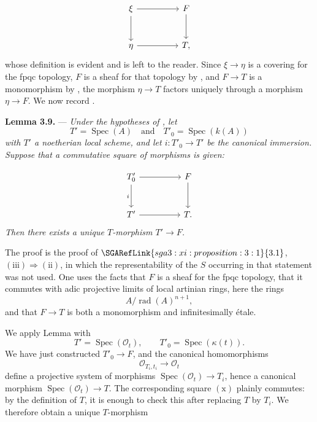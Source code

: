 \[
\begin{tikzcd}[column sep=huge,row sep=large]
  \xi \arrow[r] \arrow[d] & F \arrow[d] \\
  \eta \arrow[r] & T ,
\end{tikzcd}
\]
whose definition is evident and is left to the reader.  Since
\(\xi\to\eta\) is a covering for the fpqc topology, \(F\) is a sheaf
for that topology by , and \(F\to T\) is a monomorphism by , the
morphism \(\eta\to T\) factors uniquely through a morphism
\(\eta\to F\).  We now record .

\medskip
\noindent{}\textbf{Lemma 3.9.} ---
\textit{Under the hypotheses of
, let
\[
  T'=\operatorname{Spec}(A)
  \quad\text{and}\quad
  T'_0=\operatorname{Spec}(k(A))
\]
with \(T'\) a noetherian local scheme, and let
\(i:T'_0\to T'\) be the canonical immersion.  Suppose that a
commutative square of morphisms is given:}

\[
\begin{tikzcd}[column sep=huge,row sep=large]
  T'_0 \arrow[r] \arrow[d,"i"'] & F \arrow[d] \\
  T' \arrow[r] & T .
\end{tikzcd}
\]
\textit{Then there exists a unique \(T\)-morphism \(T'\to F\).}

The proof is the proof of \(\SGARefLink{sga3:xi:proposition:3:1}{3.1}\), \((\mathrm{iii})\Rightarrow
(\mathrm{ii})\), in which the representability of the \(S\) occurring
in that statement was not used.  One uses the facts that \(F\) is a
sheaf for the fpqc topology, that it commutes with adic projective
limits of local artinian rings, here the rings
\[
  A/\operatorname{rad}(A)^{n+1},
\]
and that \(F\to T\) is both a monomorphism and infinitesimally étale.

We apply Lemma  with
\[
  T'=\operatorname{Spec}(\mathscr O_t),
  \qquad
  T'_0=\operatorname{Spec}(\kappa(t)).
\]
We have just constructed \(T'_0\to F\), and the canonical
homomorphisms
\[
  \mathscr O_{T_i,t_i}\longrightarrow\mathscr O_t
\]
define a projective system of morphisms
\(\operatorname{Spec}(\mathscr O_t)\to T_i\), hence a canonical
morphism \(\operatorname{Spec}(\mathscr O_t)\to T\).
%
The corresponding square \(\mathrm{(x)}\) plainly commutes: by the
definition of \(T\), it is enough to check this after replacing \(T\)
by \(T_i\).  We therefore obtain a unique \(T\)-morphism

